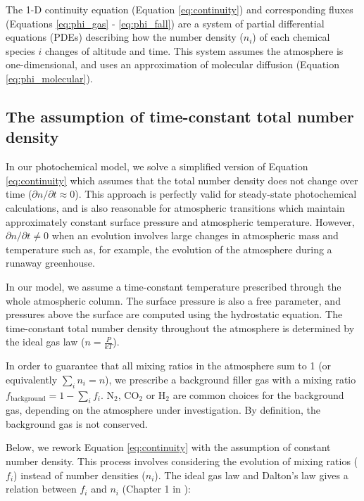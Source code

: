 The 1-D continuity equation (Equation \eqref{eq:continuity}) and corresponding fluxes (Equations \eqref{eq:phi_gas} - \eqref{eq:phi_fall}) are a system of partial differential equations (PDEs) describing how the number density ($n_{i}$) of each chemical species $i$ changes of altitude and time. This system assumes the atmosphere is one-dimensional, and uses an approximation of molecular diffusion (Equation \eqref{eq:phi_molecular}).

\subsection{The assumption of time-constant total number density} \label{sec:assume_const_num_den}

In our photochemical model, we solve a simplified version of Equation \eqref{eq:continuity} which assumes that the total number density does not change over time ($\partial n / \partial t \approx 0$). This approach is perfectly valid for steady-state photochemical calculations, and is also reasonable for atmospheric transitions which maintain approximately constant surface pressure and atmospheric temperature. However, $\partial n / \partial t \neq 0$ when an evolution involves large changes in atmospheric mass and temperature such as, for example, the evolution of the atmosphere during a runaway greenhouse.

In our model, we assume a time-constant temperature prescribed through the whole atmospheric column. The surface pressure is also a free parameter, and pressures above the surface are computed using the hydrostatic equation. The time-constant total number density throughout the atmosphere is determined by the ideal gas law ($n = \frac{P}{kT}$).

In order to guarantee that all mixing ratios in the atmosphere sum to 1 (or equivalently $\sum_i n_i = n$), we prescribe a background filler gas with a mixing ratio $f_\mathrm{background} = 1 - \sum_i f_i$. N$_2$, CO$_2$ or H$_2$ are common choices for the background gas, depending on the atmosphere under investigation. By definition, the background gas is not conserved.


Below, we rework Equation \eqref{eq:continuity} with the assumption of constant number density. This process involves considering the evolution of mixing ratios ($f_i$) instead of number densities ($n_i$). The ideal gas law and Dalton's law gives a relation between $f_i$ and $n_i$ (Chapter 1 in \cite{Catling_2017}):

